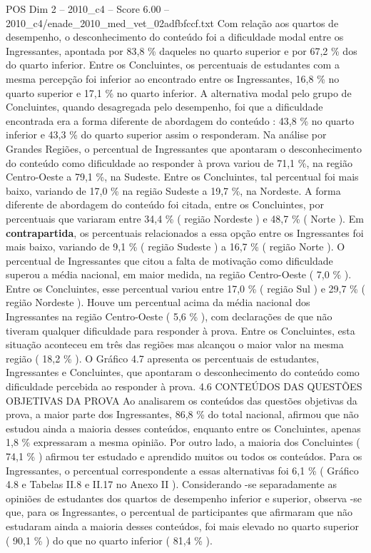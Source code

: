 \begin{textsample}{POS Dim 2 – 2010\_c4 – Score 6.00 – 2010\_c4/enade\_2010\_med\_vet\_02adfbfccf.txt}
Com relação aos quartos de desempenho, o desconhecimento do conteúdo foi a dificuldade modal entre os Ingressantes, apontada por 83,8 \% daqueles no quarto superior e por 67,2 \% dos do quarto inferior.
Entre os Concluintes, os percentuais de estudantes com a mesma percepção foi inferior ao encontrado entre os Ingressantes, 16,8 \% no quarto superior e 17,1 \% no quarto inferior.
A alternativa modal pelo grupo de Concluintes, quando desagregada pelo desempenho, foi que a dificuldade encontrada era a forma diferente de abordagem do conteúdo : 43,8 \% no quarto inferior e 43,3 \% do quarto superior assim o responderam.
Na análise por Grandes Regiões, o percentual de Ingressantes que apontaram o desconhecimento do conteúdo como dificuldade ao responder à prova variou de 71,1 \%, na região Centro-Oeste a 79,1 \%, na Sudeste.
Entre os Concluintes, tal percentual foi mais baixo, variando de 17,0 \% na região Sudeste a 19,7 \%, na Nordeste.
A forma diferente de abordagem do conteúdo foi citada, entre os Concluintes, por percentuais que variaram entre 34,4 \% ( região Nordeste ) e 48,7 \% ( Norte ).
Em \textbf{contrapartida}, os percentuais relacionados a essa opção entre os Ingressantes foi mais baixo, variando de 9,1 \% ( região Sudeste ) a 16,7 \% ( região Norte ).
O percentual de Ingressantes que citou a falta de motivação como dificuldade superou a média nacional, em maior medida, na região Centro-Oeste ( 7,0 \% ).
Entre os Concluintes, esse percentual variou entre 17,0 \% ( região Sul ) e 29,7 \% ( região Nordeste ).
Houve um percentual acima da média nacional dos Ingressantes na região Centro-Oeste ( 5,6 \% ), com declarações de que não tiveram qualquer dificuldade para responder à prova.
Entre os Concluintes, esta situação aconteceu em três das regiões mas alcançou o maior valor na mesma região ( 18,2 \% ).
O Gráfico 4.7 apresenta os percentuais de estudantes, Ingressantes e Concluintes, que apontaram o desconhecimento do conteúdo como dificuldade percebida ao responder à prova. 4.6 CONTEÚDOS DAS QUESTÕES OBJETIVAS DA PROVA Ao analisarem os conteúdos das questões objetivas da prova, a maior parte dos Ingressantes, 86,8 \% do total nacional, afirmou que não estudou ainda a maioria desses conteúdos, enquanto entre os Concluintes, apenas 1,8 \% expressaram a mesma opinião.
Por outro lado, a maioria dos Concluintes ( 74,1 \% ) afirmou ter estudado e aprendido muitos ou todos os conteúdos.
Para os Ingressantes, o percentual correspondente a essas alternativas foi 6,1 \% ( Gráfico 4.8 e Tabelas II.8 e II.17 no Anexo II ).
Considerando -se separadamente as opiniões de estudantes dos quartos de desempenho inferior e superior, observa -se que, para os Ingressantes, o percentual de participantes que afirmaram que não estudaram ainda a maioria desses conteúdos, foi mais elevado no quarto superior ( 90,1 \% ) do que no quarto inferior ( 81,4 \% ).

\end{textsample}
